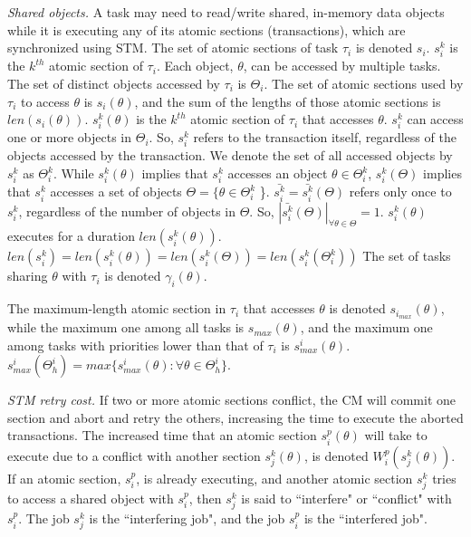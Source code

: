 \documentclass[conference]{IEEEtran}
\begin{document}
\textit{Shared objects.}
 A task may need to read/write shared, in-memory data objects while it is executing any of its atomic sections (transactions), which are synchronized using STM. 
The set of atomic sections of task $\tau_i$ is denoted $s_i$. $s_i^k$ is the $k^{th}$ atomic section of $\tau_i$. Each object, $\theta$, can be accessed by multiple tasks. The set of distinct objects accessed by $\tau_i$ is $\Theta_i$. The set of atomic sections used by $\tau_i$ to access $\theta$ is $s_i(\theta)$, and the sum of the lengths of those atomic sections is $len(s_i(\theta))$. $s_i^k(\theta)$ is the $k^{th}$ atomic section of $\tau_i$ that accesses $\theta$.
%
 $s_i^k$ can access one or more objects in $\Theta_i$. So, $s_i^k$ refers to the transaction itself, regardless of the objects accessed by the transaction. We denote the set of all accessed objects by $s_i^k$ as $\Theta_i^k$. While $s_i^k(\theta)$ implies that $s_i^k$ accesses an object $\theta \in \Theta_i^k$, $s_i^k(\Theta)$ implies that $s_i^k$ accesses a set of objects $\Theta=\{\theta \in \Theta_i^k$ \}. $\bar{s_i^k}=\bar{s_i^k}(\Theta)$ refers only once to $s_i^k$, regardless of the number of objects in $\Theta$. So, $|\bar{s_i^k}(\Theta)|_{\forall \theta \in \Theta}=1$.
%
 $s_i^k(\theta)$  executes for a duration $len(s_i^k(\theta))$. $len(s_i^k)=len(s_i^k(\theta))=len(s_i^k(\Theta))=len(s_i^k(\Theta_i^k))$ The set of tasks sharing $\theta$ with $\tau_i$ is denoted $\gamma_i(\theta)$. 

The maximum-length atomic section in $\tau_i$ that accesses $\theta$ is denoted $s_{i_{max}} (\theta)$, while the maximum one among all tasks is $s_{max} (\theta)$, and the maximum one among tasks with priorities lower than that of $\tau_i$ is $s_{max}^i (\theta)$. $s_{max}^i(\Theta_h^i)=max\{s_{max}^i(\theta):\forall \theta \in \Theta_h^i\}$.

\textit{STM retry cost.} If two or more atomic sections conflict, the CM will commit one section and abort and retry the others, increasing the time to execute the aborted transactions. The increased time that an atomic section $s_i^p (\theta)$ will take to execute due to a conflict with another section $s_j^k (\theta)$, is denoted $W_{i}^{p}(s_{j}^{k}(\theta))$. If an atomic section, $s_i^p$, is already executing, and another atomic section $s_j^k$ tries to access a shared object with $s_i^p$, then $s_j^k$ is said to ``interfere" or ``conflict" with $s_i^p$. The job $s_j^k$ is the ``interfering job", and the job $s_i^p$ is the ``interfered job".
\end{document}
